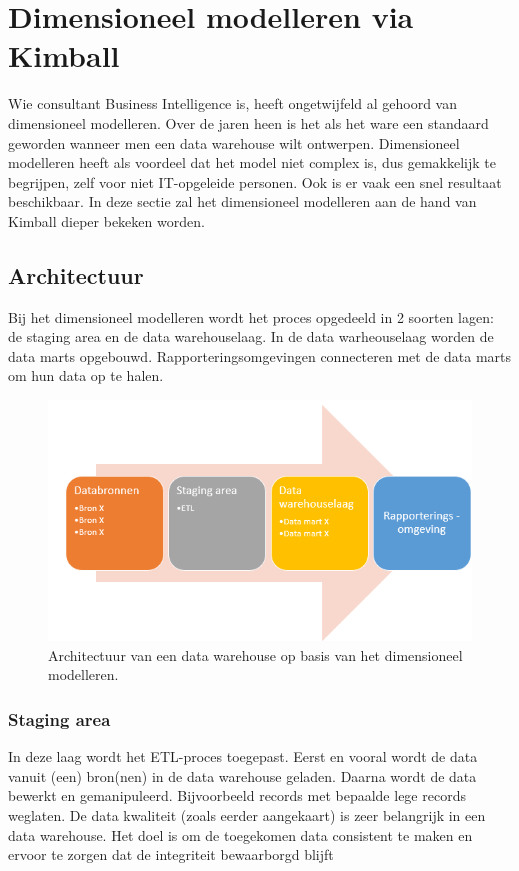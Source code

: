 \pagebreak

\section{Dimensioneel modelleren via Kimball}
Wie consultant Business Intelligence is, heeft ongetwijfeld al gehoord van dimensioneel modelleren. Over de jaren heen is het als het ware een standaard geworden wanneer men een data warehouse wilt ontwerpen. Dimensioneel modelleren heeft als voordeel dat het model niet complex is, dus gemakkelijk te begrijpen, zelf voor niet IT-opgeleide personen. Ook is er vaak een snel resultaat beschikbaar. In deze sectie zal het dimensioneel modelleren aan de hand van Kimball dieper bekeken worden. 


\subsection{Architectuur}
Bij het dimensioneel modelleren wordt het proces opgedeeld in 2 soorten lagen: de staging area en de data warehouselaag. In de data warheouselaag worden de data marts opgebouwd. Rapporteringsomgevingen connecteren met de data marts om hun data op te halen.

\begin{figure}[h]
	\centering
	\includegraphics[scale=0.8]{../images/dimmodel.PNG}
	\caption{Architectuur van een data warehouse op basis van het dimensioneel modelleren.}
	\label{fig:dimmodel}
\end{figure}

\subsubsection{Staging area}
In deze laag wordt het ETL-proces toegepast. Eerst en vooral wordt de data vanuit (een) bron(nen) in de data warehouse geladen. Daarna wordt de data bewerkt en gemanipuleerd. Bijvoorbeeld records met bepaalde lege records weglaten. De data kwaliteit (zoals eerder aangekaart) is zeer belangrijk in een data warehouse. Het doel is om de toegekomen data consistent te maken en ervoor te zorgen dat de integriteit bewaarborgd blijft ~\autocite{Kimball2013}

